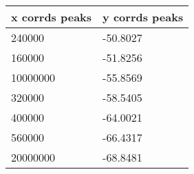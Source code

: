 \begin{tabular}{ll}
x corrds peaks & y corrds peaks \\ 
\hline 
240000 & -50.8027 \\ 
160000 & -51.8256 \\ 
10000000 & -55.8569 \\ 
320000 & -58.5405 \\ 
400000 & -64.0021 \\ 
560000 & -66.4317 \\ 
20000000 & -68.8481 \\ 
\hline 
\end{tabular}